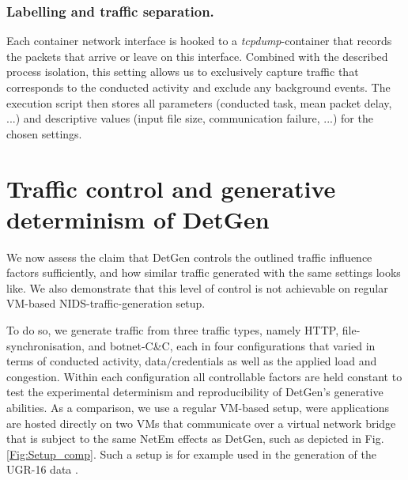 
\subsubsection*{Labelling and traffic separation.}

Each container network interface is hooked to a \emph{tcpdump}-container that records the packets that arrive or leave on this interface. Combined with the described process isolation, this setting allows us to exclusively capture traffic that corresponds to the conducted activity and exclude any background events. The execution script then stores all parameters (conducted task, mean packet delay, ...) and descriptive values (input file size, communication failure, ...) for the chosen settings.





\section{Traffic control and generative determinism of DetGen}\label{Sec:Determinism}
We now assess the claim that DetGen controls the outlined traffic influence factors sufficiently, and how similar traffic generated with the same settings looks like. We also demonstrate that this level of control is not achievable on regular VM-based NIDS-traffic-generation setup.

To do so, we generate traffic from three traffic types, namely HTTP, file-synchronisation, and botnet-C\&C, each in four configurations that varied in terms of conducted activity, data/credentials as well as the applied load and congestion. Within each configuration all controllable factors are held constant to test the experimental determinism and reproducibility of DetGen's generative abilities. 
As a comparison, we use a regular VM-based setup, were applications are hosted directly on two VMs that communicate over a virtual network bridge that is subject to the same NetEm effects as DetGen, such as depicted in Fig. \ref{Fig:Setup_comp}. Such a setup is for example used in the generation of the UGR-16 data \cite{macia2018ugr}.


